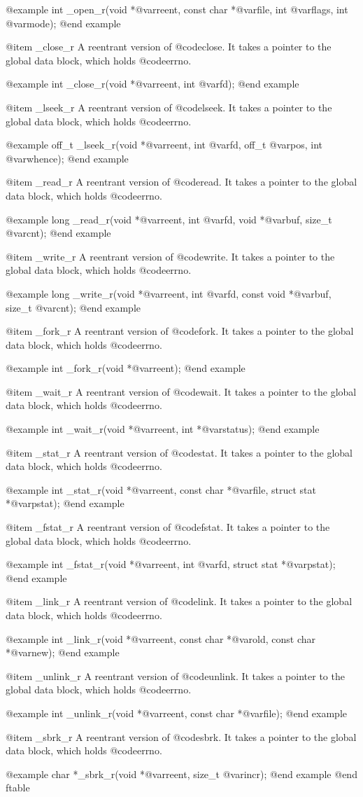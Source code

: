 @example
int _open_r(void *@var{reent},
    const char *@var{file}, int @var{flags}, int @var{mode});
@end example

@item _close_r
A reentrant version of @code{close}.  It takes a pointer to the global
data block, which holds @code{errno}.

@example
int _close_r(void *@var{reent}, int @var{fd});
@end example

@item _lseek_r
A reentrant version of @code{lseek}.  It takes a pointer to the global
data block, which holds @code{errno}.

@example
off_t _lseek_r(void *@var{reent},
    int @var{fd}, off_t @var{pos}, int @var{whence});
@end example

@item _read_r
A reentrant version of @code{read}.  It takes a pointer to the global
data block, which holds @code{errno}.

@example
long _read_r(void *@var{reent},
    int @var{fd}, void *@var{buf}, size_t @var{cnt});
@end example

@item _write_r
A reentrant version of @code{write}.  It takes a pointer to the global
data block, which holds @code{errno}.

@example
long _write_r(void *@var{reent},
    int @var{fd}, const void *@var{buf}, size_t @var{cnt});
@end example

@item _fork_r
A reentrant version of @code{fork}.  It takes a pointer to the global
data block, which holds @code{errno}.

@example
int _fork_r(void *@var{reent});
@end example

@item _wait_r
A reentrant version of @code{wait}.  It takes a pointer to the global
data block, which holds @code{errno}.

@example
int _wait_r(void *@var{reent}, int *@var{status});
@end example

@item _stat_r
A reentrant version of @code{stat}.  It takes a pointer to the global
data block, which holds @code{errno}.

@example
int _stat_r(void *@var{reent},
    const char *@var{file}, struct stat *@var{pstat});
@end example

@item _fstat_r
A reentrant version of @code{fstat}.  It takes a pointer to the global
data block, which holds @code{errno}.

@example
int _fstat_r(void *@var{reent},
    int @var{fd}, struct stat *@var{pstat});
@end example

@item _link_r
A reentrant version of @code{link}.  It takes a pointer to the global
data block, which holds @code{errno}.

@example
int _link_r(void *@var{reent},
    const char *@var{old}, const char *@var{new});
@end example

@item _unlink_r
A reentrant version of @code{unlink}.  It takes a pointer to the global
data block, which holds @code{errno}.

@example
int _unlink_r(void *@var{reent}, const char *@var{file});
@end example

@item _sbrk_r
A reentrant version of @code{sbrk}.  It takes a pointer to the global
data block, which holds @code{errno}.

@example
char *_sbrk_r(void *@var{reent}, size_t @var{incr});
@end example
@end ftable
